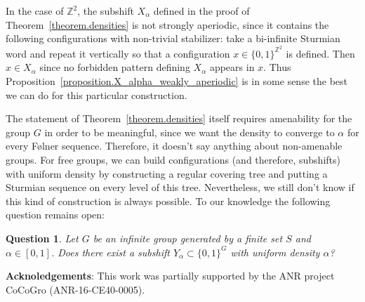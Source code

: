 \documentclass[letterpaper]{article}
\theoremstyle{plain}
\newtheorem*{question*}{Question}
\def\ZZ{\mathbb{Z}}
\begin{document}
	In the case of $\ZZ^2$, the subshift $X_\alpha$ defined in the proof of Theorem~\ref{theorem.densities} is not strongly aperiodic, since it contains the following configurations with non-trivial stabilizer: take a bi-infinite Sturmian word and repeat it vertically so that a configuration $x\in\{0,1\}^{\ZZ^2}$ is defined. Then $x\in X_\alpha$ since no forbidden pattern defining $X_\alpha$ appears in $x$. Thus Proposition~\ref{proposition.X_alpha_weakly_aperiodic} is in some sense the best we can do for this particular construction.
	
	The statement of Theorem~\ref{theorem.densities} itself requires amenability for the group $G$ in order to be meaningful, since we want the density to converge to $\alpha$ for every F\o lner sequence. Therefore, it doesn't say anything about non-amenable groups. For free groups, we can build configurations (and therefore, subshifts) with uniform density by constructing a regular covering tree and putting a Sturmian sequence on every level of this tree. Nevertheless, we still don't know if this kind of construction is always possible. To our knowledge the following question remains open:
	\begin{question*}
		Let $G$ be an infinite group generated by a finite set $S$ and $\alpha\in[0,1]$. Does there exist a subshift $Y_\alpha\subset \{0,1\}^{G}$ with uniform density $\alpha$?
	\end{question*}
	
	
	\textbf{Acknoledgements}: This work was partially supported by the ANR project CoCoGro (ANR-16-CE40-0005).
	
\end{document}
